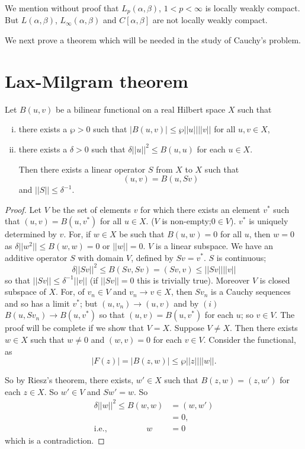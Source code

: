We mention without proof that $L_p (\alpha, \beta)$, $1 < p < \infty$
is locally weakly compact. But $L(\alpha, \beta)$, $L_\infty (\alpha,
\beta)$ and $C[\alpha,
 \beta]$ are not locally weak\-ly compact. 

We next prove a theorem which will be needed in the study of Cauchy's
problem. 

\section{Lax-Milgram theorem}\label{chap4:sec2} 

Let $B(u, v )$ be a bilinear functional on a real Hilbert space $X$ such that 
\begin{enumerate}[(i)]
\item there exists a $\wp > 0$ such that $|B (u, v) |\leq \wp || u
 || || v||$ for all $u, v \in X$, 
\item there exists a $\delta > 0$ such that $\delta || u||^2 \leq B
 (u, u)$ for each $u \in X$. 

 Then there exists a linear operator $S$ from $X$ to $X$ such that 
 $$
 (u, v ) = B(u, S v)
 $$
 and $|| S || \leq \delta^{-1}$. 
\end{enumerate}

\begin{proof}
 Let $V$ be the set of elements $v$ for which there exists an element
 $v^*$ such that $(u, v )= B (u, v^*)$ for all $u \in X$. ($V$ is
 non-empty;\pageoriginale $0 \in V$). $v^*$ is uniquely determined by $v$. For, if
 $w \in X$ be such that $B(u, w) = 0$ for all $u$, then $w = 0 $ as
 $\delta || w^2 || \leq B (w, w ) = 0$ or $|| w|| = 0$. $V$ is a
 linear subspace. We have an additive operator $S$ with domain $V$,
 defined by $S v = v^*$. $S$ is continuous; 
 $$
 \delta || S v ||^2 \leq B (Sv, Sv) = (Sv, v)\leq ||Sv|| ||v||
 $$
 so that $|| Sv|| \leq \delta^{-1} || v ||$ (if $|| Sv|| = 0$ this is
 trivially true). Moreover $V$ is closed subspace of $X$. For, of
 $v_n \in V$ and $v_n \to v \in X$, then $S v_n$ is a Cauchy
 sequences and so has a limit $v^*$; but $(u, v_n) \to (u, v )$ and
 by $(i)$ $B(u, Sv_n) \to B(u, v^*)$ so that $(u, v ) = B(u, v^*)$
 for each $u$; so $v \in V$. The proof will be complete if we show
 that $V = X$. Suppose $V \neq X$. Then there exists $w \in X$ such
 that $w \neq 0$ and $(w, v) = 0$ for each $v \in V$. Consider the
 functional, as 
 $$
 |F(z)| = | B(z, w)|\leq \wp || z || || w||.
 $$
 
 So by Riesz's theorem, there exists, $w' \in X$ such that $B(z, w) =
 (z, w')$ for each $z \in X$. So $w' \in V$ and $Sw' = w$. So 
 \begin{align*}
  \delta || w ||^2 \leq B(w, w) & = (w,  w')\\
  & = 0,\\
  \text{i.e.,} \hspace{2cm} w & = 0
 \end{align*}
 which is a contradiction. 
\end{proof}

